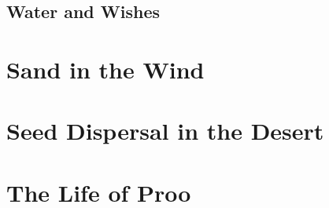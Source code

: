 \documentclass[12pt]{book}
\begin{document}
\section{Water and Wishes}


\chapter{Sand in the Wind} %

\chapter{Seed Dispersal in the Desert} %

\chapter{The Life of Proo} %
\end{document}
